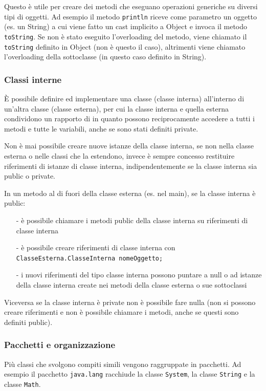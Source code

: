 \documentclass[a4paper]{article}
\begin{document}
Questo è utile per creare dei metodi che eseguano operazioni generiche su diversi tipi di oggetti. Ad esempio il metodo \verb|println| riceve
come parametro un oggetto (es. un String) a cui viene fatto un cast implicito a Object e invoca il metodo \verb|toString|. Se non è stato eseguito
l'overloading del metodo, viene chiamato il \verb|toString| definito in Object (non è questo il caso), altrimenti viene chiamato l'overloading della
sottoclasse (in questo caso definito in String).

\subsubsection*{Classi interne}
È possibile definire ed implementare una classe (classe interna) all'interno di un'altra classe (classe esterna), per cui la classe interna e
quella esterna condividono un rapporto di  in quanto possono reciprocamente accedere a tutti i metodi e tutte le variabili, anche
se sono stati definiti private.

Non è mai possibile creare nuove istanze della classe interna, se non nella classe esterna o nelle classi che la estendono, invece è sempre
concesso restituire riferimenti di istanze di classe interna, indipendentemente se la classe interna sia public o private.

In un metodo al di fuori della classe esterna (es. nel main), se la classe interna è public:
\begin{itemize} [topsep=3pt, itemsep=0pt]
	\item[-] è possibile chiamare i metodi public della classe interna su riferimenti di classe interna
	\item[-] è possibile creare riferimenti di classe interna con \verb|ClasseEsterna.ClasseInterna nomeOggetto;|
	\item[-] i nuovi riferimenti del tipo classe interna possono puntare a null o ad istanze della classe interna create nei metodi della classe
	esterna o sue sottoclassi
\end{itemize}

Viceversa se la classe interna è private non è possibile fare nulla (non si possono creare riferimenti e non è possibile chiamare i metodi, anche
se questi sono definiti public).

\subsubsection*{Pacchetti e organizzazione}
Più classi che svolgono compiti simili vengono raggruppate in pacchetti. Ad esempio il pacchetto \verb|java.lang| racchiude la classe
\verb|System|, la classe \verb|String| e la classe \verb|Math|.
\end{document}
